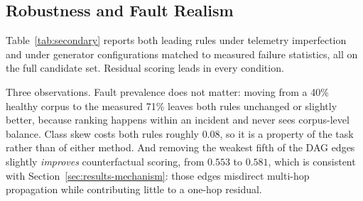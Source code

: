 \documentclass[conference]{IEEEtran}
\begin{document}
\subsection{Robustness and Fault Realism}
\label{sec:results-secondary}
Table~\ref{tab:secondary} reports both leading rules under telemetry imperfection and under generator configurations matched to measured failure statistics, all on the full candidate set. Residual scoring leads in every condition.

\begin{table}[htbp]
\centering
\caption{Top-1 accuracy under telemetry imperfection and measured fault statistics, full candidate set, 5 seeds.}
\label{tab:secondary}
\end{table}

Three observations. Fault prevalence does not matter: moving from a 40\% healthy corpus to the measured 71\% leaves both rules unchanged or slightly better, because ranking happens within an incident and never sees corpus-level balance. Class skew costs both rules roughly $0.08$, so it is a property of the task rather than of either method. And removing the weakest fifth of the DAG edges slightly \emph{improves} counterfactual scoring, from $0.553$ to $0.581$, which is consistent with Section~\ref{sec:results-mechanism}: those edges misdirect multi-hop propagation while contributing little to a one-hop residual.
\end{document}
